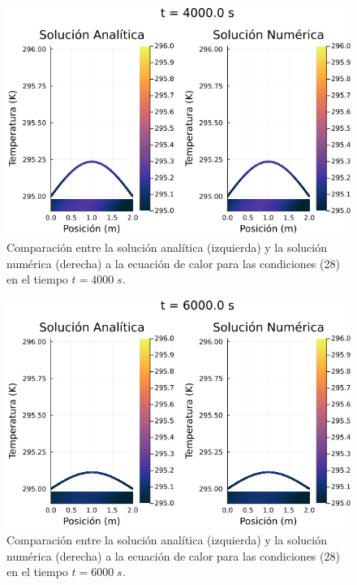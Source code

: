 \documentclass[12pt]{article}
\begin{document}
\begin{figure}[H]
\begin{center}
    \includegraphics[width=0.79\linewidth]{Ejemplo_01_t_3.png}
    \caption{Comparación entre la solución analítica (izquierda) y la solución numérica (derecha) a la ecuación de calor para las condiciones (28) en el tiempo $t=4000 \; s$.}
\end{center}
\end{figure}

\begin{figure}[H]
\begin{center}
    \includegraphics[width=0.79\linewidth]{Ejemplo_01_t_4.png}
    \caption{Comparación entre la solución analítica (izquierda) y la solución numérica (derecha) a la ecuación de calor para las condiciones (28) en el tiempo $t=6000 \; s$.}
\end{center}
\end{figure}
\end{document}
